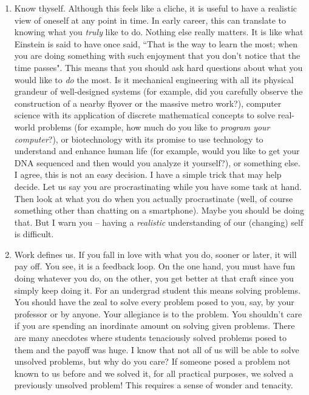 \documentclass[12pt]{article}
\begin{document}
\begin{enumerate}
    \item Know thyself. Although this feels like a cliche, it is useful to have a realistic view of oneself at any point in time. In early career, this can translate to knowing what you \emph{truly} like to do. Nothing else really matters. It is like what Einstein is said to have once said, ``That is the way to learn the most; when you are doing something with such enjoyment that you don't notice that the time passes". This means that you should ask hard questions about what you would like to \emph{do} the most. Is it mechanical engineering with all its physical grandeur of well-designed systems (for example, did you carefully observe the construction of a nearby flyover or the massive metro work?), computer science with its application of discrete mathematical concepts to solve real-world problems (for example, how much do you like to \emph{program your computer}?), or biotechnology with its promise to use technology to understand and enhance human life (for example, would you like to get your DNA sequenced and then would you analyze it yourself?), or something else. I agree, this is not an easy decision. I have a simple trick that may help decide. Let us say you are procrastinating while you have some task at hand. Then look at what you do when you actually procrastinate (well, of course something other than chatting on a smartphone). Maybe you should be doing that. But I warn you -- having a \emph{realistic} understanding of our (changing) self is difficult.
    \item Work defines us. If you fall in love with what you do, sooner or later, it will pay off. You see, it is a feedback loop. On the one hand, you must have fun doing whatever you do, on the other, you get better at that craft since you simply keep doing it. For an undergrad student this means solving problems. You should have the zeal to solve every problem posed to you, say, by your professor or by anyone. Your allegiance is to the problem. You shouldn't care if you are spending an inordinate amount on solving given problems. There are many anecdotes where students tenaciously solved problems posed to them and the payoff was huge. I know that not all of us will be able to solve unsolved problems, but why do you care? If someone posed a problem not known to us before and we solved it, for all practical purposes, we solved a previously unsolved problem! This requires a sense of wonder and tenacity.

\end{enumerate}
\end{document}
